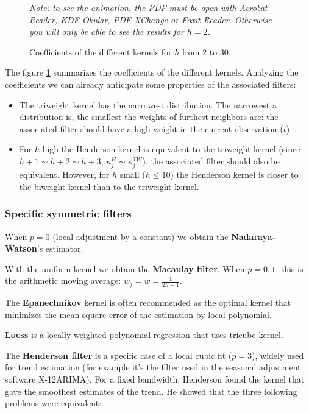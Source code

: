\documentclass[
  12pt,
  ,
  a4paper]{article}
\newcommand\1{\mathds{1}}
\begin{document}
\begin{figure}[!ht]
\caption{Coefficients of the different kernels for $h$ from 2 to 30.}\label{fig:kernels}\footnotesize
\emph{Note: to see the animation, the PDF must be open with Acrobat Reader, KDE Okular, PDF-XChange or Foxit Reader. 
Otherwise you will only be able to see the results for $h=2$.}
\end{figure}

The figure \ref{fig:kernels} summarizes the coefficients of the different kernels.
Analyzing the coefficients we can already anticipate some properties of the associated filters:

\begin{itemize}
\item
  The triweight kernel has the narrowest distribution.
  The narrowest a distribution is, the smallest the weights of furthest neighbors are: the associated filter should have a high weight in the current observation (\(t\)).
\item
  For \(h\) high the Henderson kernel is equivalent to the triweight kernel (since \(h+1\sim h+2 \sim h+3\), \(\kappa_j^H\sim\kappa_j^{TW}\)), the associated filter should also be equivalent.
  However, for \(h\) small (\(h\leq10\)) the Henderson kernel is closer to the biweight kernel than to the triweight kernel.
\end{itemize}

\hypertarget{sec:sympolyfilter}{%
\subsubsection{Specific symmetric filters}\label{sec:sympolyfilter}}

When \(p=0\) (local adjustment by a constant) we obtain the \textbf{Nadaraya-Watson}'s estimator.

With the uniform kernel we obtain the \textbf{Macaulay filter}.
When \(p=0,1\), this is the arithmetic moving average: \(w_j=w=\frac{1}{2h+1}\).

The \textbf{Epanechnikov} kernel is often recommended as the optimal kernel that minimizes the mean square error of the estimation by local polynomial.

\textbf{Loess} is a locally weighted polynomial regression that uses tricube kernel.

The \textbf{Henderson filter} is a specific case of a local cubic fit (\(p=3\)), widely used for trend estimation (for example it's the filter used in the seasonal adjustment software X-12ARIMA). For a fixed bandwidth, Henderson found the kernel that gave the smoothest estimates of the trend.
He showed that the three following problems were equivalent:
\end{document}
